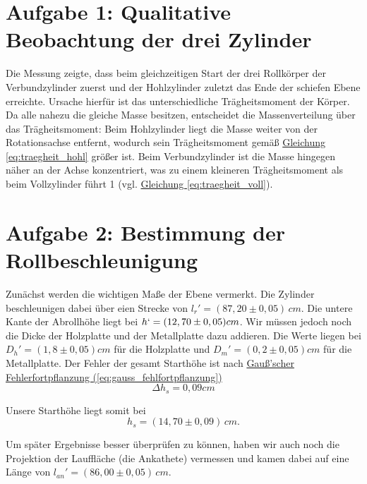\twocolumn


\section{Aufgabe 1: Qualitative Beobachtung der drei Zylinder}
Die Messung zeigte, dass beim gleichzeitigen Start der drei Rollkörper der Verbundzylinder 
zuerst und der Hohlzylinder zuletzt das Ende der schiefen Ebene erreichte. 
Ursache hierfür ist das unterschiedliche Trägheitsmoment der Körper. 
Da alle nahezu die gleiche Masse besitzen, entscheidet die Massenverteilung über das Trägheitsmoment: 
Beim Hohlzylinder liegt die Masse weiter von der Rotationsachse entfernt, wodurch sein 
Trägheitsmoment gemäß \hyperref[eq:traegheit_hohl]{Gleichung \ref*{eq:traegheit_hohl}} größer ist. 
Beim Verbundzylinder ist die Masse hingegen näher an der Achse konzentriert, was zu einem kleineren Trägheitsmoment als beim Vollzylinder führt 1
(vgl. \hyperref[eq:traegheit_voll]{Gleichung \ref*{eq:traegheit_voll}}).


\section{Aufgabe 2: Bestimmung der Rollbeschleunigung}
Zunächst werden die wichtigen Maße der Ebene vermerkt. Die Zylinder beschleunigen dabei über eien Strecke von $l_{r}' = (87,20 \pm 0,05) \, cm$. Die untere Kante der Abrollhöhe liegt bei $h` = (12,70 \pm 0,05) cm$. Wir müssen jedoch noch die Dicke der Holzplatte und der Metallplatte dazu addieren. Die Werte liegen bei $D_h'= (1,8 \pm 0,05) cm$ für die Holzplatte und $D_m'= (0,2 \pm 0,05) cm$ für die Metallplatte.
Der Fehler der gesamt Starthöhe ist nach \hyperref[eq:gauss_fehlfortpflanzung]{Gauß'scher Fehlerfortpflanzung (\ref*{eq:gauss_fehlfortpflanzung})}
\begin{equation}
    \Delta h_s = 0,09 cm
\end{equation}

Unsere Starthöhe liegt somit bei
\begin{equation}
    h_s = (14,70 \pm 0,09)\, cm.
\end{equation}

Um später Ergebnisse besser überprüfen zu können, haben wir auch noch die Projektion der Lauffläche (die Ankathete) vermessen und kamen dabei auf eine Länge von $l_{an}' = (86,00 \pm 0,05) \, cm$.

